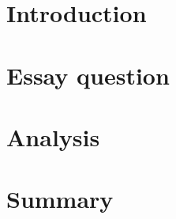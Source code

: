 \documentclass{article}
\begin{document}


\section{Introduction}
    

\section{Essay question}
    

\section{Analysis}
    

\section{Summary}
    

\nocite{*}
\printbibliography
\end{document}
